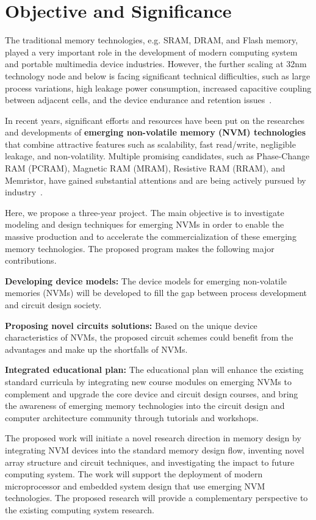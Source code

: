 \section{Objective and Significance}

The traditional memory technologies, e.g. SRAM, DRAM, and Flash memory, played a very important role in the development of modern computing system and portable multimedia device industries. However, the further scaling at 32nm technology node and below is facing significant technical difficulties, such as large process variations, high leakage power consumption, increased capacitive coupling between adjacent cells, and the device endurance and retention issues~\cite{ITRS07,Kinam07}.

In recent years, significant efforts and resources have been put on the researches and developments of \textbf{emerging non-volatile memory (NVM) technologies} that combine attractive features such as scalability, fast read/write, negligible leakage, and non-volatility. Multiple promising candidates, such as Phase-Change RAM (PCRAM), Magnetic RAM (MRAM), Resistive RAM (RRAM), and Memristor, have gained substantial attentions and are being actively pursued by industry~\cite{ITRS07,burr:scm08}.

Here, we propose a three-year project. The main objective is to investigate modeling and design techniques for emerging NVMs in order to enable the massive production and to accelerate the commercialization of these emerging memory technologies. The proposed program makes the following major contributions.

\vspace{5pt}
\squishlist
\item {\textbf{Developing device models:} The device models for emerging non-volatile memories (NVMs) will be developed to fill the gap between process development and circuit design society.}
\item {\textbf{Proposing novel circuits solutions:} Based on the unique device characteristics of NVMs, the proposed circuit schemes could benefit from the advantages and make up the shortfalls of NVMs.}
\item {\textbf{Integrated educational plan:} The educational plan will enhance the existing standard curricula by integrating new course modules on emerging NVMs to complement and upgrade the core device and circuit design courses, and bring the awareness of emerging memory technologies into the circuit design and computer architecture community through tutorials and workshops.}
\squishend
\vspace{5pt}

The proposed work will initiate a novel research direction in memory design by integrating NVM devices into the standard memory design flow, inventing novel array structure and circuit techniques, and investigating the impact to future computing system. The work will support the deployment of modern microprocessor and embedded system design that use emerging NVM technologies. The proposed research will provide a complementary perspective to the existing computing system research.

